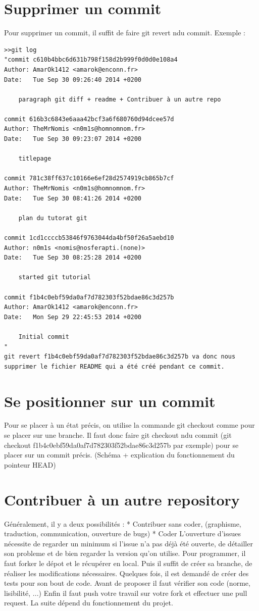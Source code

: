\documentclass[a4paper,10pt]{report}
\begin{document}
  \section{Supprimer un commit}
  Pour supprimer un commit, il suffit de faire git revert n\no du commit.
Exemple :
\begin{verbatim}
>>git log
"commit c610b4bbc6d631b798f158d2b999f0d0d0e108a4
Author: AmarOk1412 <amarok@enconn.fr>
Date:   Tue Sep 30 09:26:40 2014 +0200

    paragraph git diff + readme + Contribuer à un autre repo

commit 616b3c6843e6aaa42bcf3a6f680760d94dcee57d
Author: TheMrNomis <n0m1s@homnomnom.fr>
Date:   Tue Sep 30 09:23:07 2014 +0200

    titlepage

commit 781c38ff637c10166e6ef28d2574919cb865b7cf
Author: TheMrNomis <n0m1s@homnomnom.fr>
Date:   Tue Sep 30 08:41:26 2014 +0200

    plan du tutorat git

commit 1cd1ccccb53846f9763044da4bf50f26a5aebd10
Author: n0m1s <nomis@nosferapti.(none)>
Date:   Tue Sep 30 08:25:28 2014 +0200

    started git tutorial

commit f1b4c0ebf59da0af7d782303f52bdae86c3d257b
Author: AmarOk1412 <amarok@enconn.fr>
Date:   Mon Sep 29 22:45:53 2014 +0200

    Initial commit
"
git revert f1b4c0ebf59da0af7d782303f52bdae86c3d257b va donc nous supprimer le fichier README qui a été créé pendant ce commit.
\end{verbatim}
  \section{Se positionner sur un commit}
  Pour se placer à un état précis, on utilise la commande git checkout comme pour se placer sur une branche. Il faut donc faire git checkout n\no du commit (git checkout f1b4c0ebf59da0af7d782303f52bdae86c3d257b par exemple) pour se placer sur un commit précis.
  (Schéma + explication du fonctionnement du pointeur HEAD)
  \section{Contribuer à un autre repository}
Généralement, il y a deux possibilités : 
* Contribuer sans coder, (graphisme, traduction, communication, ouverture de bugs)
* Coder
L'ouverture d'issues nécessite de regarder un minimum si l'issue n'a pas déjà été ouverte, de détailler son probleme et de bien regarder la version qu'on utilise.
Pour programmer, il faut forker le dépot et le récupérer en local.
Puis il suffit de créer sa branche, de réaliser les modifications nécessaires.
Quelques fois, il est demandé de créer des tests pour son bout de code.
Avant de proposer il faut vérifier son code (norme, lisibilité, ...)
Enfin il faut push votre travail sur votre fork et effectuer une pull request.
La suite dépend du fonctionnement du projet.
\end{document}
